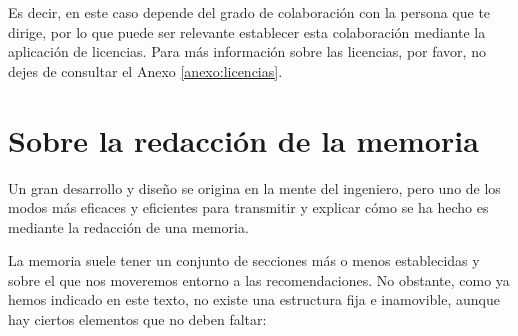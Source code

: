 {Es decir, en este caso depende del grado de colaboración con la persona que te dirige, por lo que puede ser relevante establecer esta colaboración mediante la aplicación de licencias. Para más información sobre las licencias, por favor, no dejes de consultar el Anexo \ref{anexo:licencias}.




\section{Sobre la redacción de la memoria} %



Un gran desarrollo y diseño se origina en la mente del ingeniero, pero uno de los modos más eficaces y eficientes para transmitir y explicar cómo se ha hecho es mediante la redacción de una memoria. 

La memoria suele tener un conjunto de secciones más o menos establecidas y sobre el que nos moveremos entorno a las recomendaciones. No obstante, como ya hemos indicado en este texto, no existe una estructura fija e inamovible, aunque hay ciertos elementos que no deben faltar:

}
